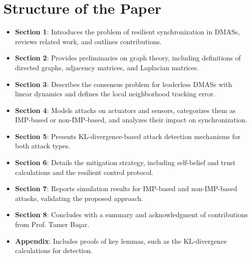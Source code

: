 \documentclass{article}
\begin{document}
\section*{Structure of the Paper}
\begin{itemize}
    \item \textbf{Section 1}: Introduces the problem of resilient synchronization in DMASs, reviews related work, and outlines contributions.
    \item \textbf{Section 2}: Provides preliminaries on graph theory, including definitions of directed graphs, adjacency matrices, and Laplacian matrices.
    \item \textbf{Section 3}: Describes the consensus problem for leaderless DMASs with linear dynamics and defines the local neighborhood tracking error.
    \item \textbf{Section 4}: Models attacks on actuators and sensors, categorizes them as IMP-based or non-IMP-based, and analyzes their impact on synchronization.
    \item \textbf{Section 5}: Presents KL-divergence-based attack detection mechanisms for both attack types.
    \item \textbf{Section 6}: Details the mitigation strategy, including self-belief and trust calculations and the resilient control protocol.
    \item \textbf{Section 7}: Reports simulation results for IMP-based and non-IMP-based attacks, validating the proposed approach.
    \item \textbf{Section 8}: Concludes with a summary and acknowledgment of contributions from Prof. Tamer Başar.
    \item \textbf{Appendix}: Includes proofs of key lemmas, such as the KL-divergence calculations for detection.
\end{itemize}
\end{document}
